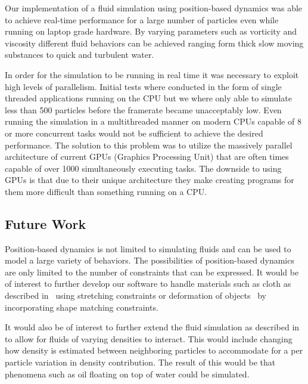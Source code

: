 Our implementation of a fluid simulation using position-based dynamics was able
to achieve real-time performance for a large number of particles even while
running on laptop grade hardware. By varying parameters such as vorticity and
viscosity different fluid behaviors can be achieved ranging form thick slow
moving substances to quick and turbulent water.

In order for the simulation to be running in real time it was necessary to
exploit high levels of parallelism. Initial tests where conducted in the form
of single threaded applications running on the CPU but we where only able to
simulate less than 500 particles before the framerate became unacceptably low.
Even running the simulation in a multithreaded manner on modern CPUs capable of
8 or more concurrent tasks would not be sufficient to achieve the desired
performance. The solution to this problem was to utilize the massively parallel
architecture of current GPUs (Graphics Processing Unit) that are often times
capable of over 1000 simultaneously executing tasks. The downside to using GPUs
is that due to their unique architecture they make creating programs for them
more difficult than something running on a CPU.

\subsection{Future Work}
Position-based dynamics is not limited to simulating
fluids and can be used to model a large variety of behaviors. The possibilities
of position-based dynamics are only limited to the number of constraints that
can be expressed. It would be of interest to further develop our software to
handle materials such as cloth as described in~\cite{muller2007position} using
stretching constraints or deformation of objects~\cite{muller2005meshless} by
incorporating shape matching constraints.

It would also be of interest to further extend the fluid simulation as
described in~\cite{macklin2014unified} to allow for fluids of varying densities
to interact. This would include changing how density is estimated between
neighboring particles to accommodate for a per particle variation in density
contribution. The result of this would be that phenomena such as oil floating
on top of water could be simulated.
